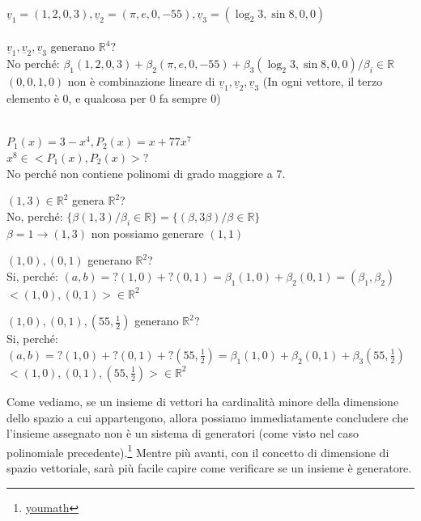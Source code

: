 \begin{es}
	\phantom{}\\
	$\underline{v}_1=(1,2,0,3), \underline{v}_2=(\pi,e,0,-55), \underline{v}_3=(\log_2 3,\sin 8,0,0)$\\\\
	$\underline{v}_1, \underline{v}_2, \underline{v}_3$ generano $\mathbb{R}^4$?\\
	No perché: $\beta_1(1,2,0,3)+\beta_2(\pi,e,0,-55)+\beta_3(\log_2 3,\sin 8,0,0)/\beta_i\in\mathbb{R}$\\
	$(0,0,1,0)$ non è combinazione lineare di $\underline{v}_1,\underline{v}_2,\underline{v}_3$ (In ogni vettore, il terzo elemento è 0, e qualcosa per 0 fa sempre 0)\\\\
\end{es}
\begin{es}
	$P_1(x)=3-x^4, P_2(x)=x+77x^7$\\
	$x^8\in<P_1(x), P_2(x)>$?\\
	No perché non contiene polinomi di grado maggiore a 7.
\end{es}
\begin{es}
	$(1,3)\in\mathbb{R}^2$ genera $\mathbb{R}^2$?\\
	No, perché: $\{\beta(1,3)/\beta_i\in\mathbb{R}\}=\{(\beta,3\beta)/\beta\in\mathbb{R}\}$\\
	$\beta=1\rightarrow(1,3)$ non possiamo generare $(1,1)$
\end{es}
\begin{es}
	$(1,0),(0,1)$ generano $\mathbb{R}^2$?\\
	Si, perché: $(a,b)=?(1,0)+?(0,1)=\beta_1(1,0)+\beta_2(0,1)=(\beta_1,\beta_2)$\\
	$<(1,0),(0,1)>\in\mathbb{R}^2$
\end{es}
\begin{es}
	$(1,0),(0,1),(55,\frac{1}{2})$ generano $\mathbb{R}^2$?\\
	Si, perché: $(a,b)=?(1,0)+?(0,1)+?(55,\frac{1}{2})=\beta_1(1,0)+\beta_2(0,1)+\beta_3(55,\frac{1}{2})$\\
	$<(1,0),(0,1),(55,\frac{1}{2})>\in\mathbb{R}^2$
\end{es}

Come vediamo, se un insieme di vettori ha cardinalità minore della dimensione dello spazio a cui appartengono, allora possiamo immediatamente concludere che l'insieme assegnato non è un sistema di generatori (come visto nel caso polinomiale precedente).\footnote{\href{https://www.youmath.it/lezioni/algebra-lineare/matrici-e-vettori/678-sistema-di-generatori-di-uno-spazio-vettoriale.html}{youmath}} Mentre più avanti, con il concetto di dimensione di spazio vettoriale, sarà più facile capire come verificare se un insieme è generatore.

